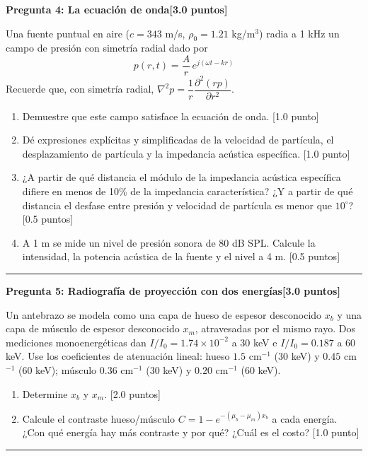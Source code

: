 \documentclass[11pt,a4paper]{article}
\newcommand{\sect}[1]{\vspace{10pt}{\large\bfseries #1}\par\vspace{-6pt}\rule{\linewidth}{0.4pt}\par}
\newcommand{\question}[2]{\vspace{6pt}\textbf{#1}\hfill\textbf{[#2]}\par}
\newcommand{\pts}[1]{\hfill[#1]}
\begin{document}
\question{Pregunta 4: La ecuación de onda}{3.0 puntos}
Una fuente puntual en aire ($c = 343$ m/s, $\rho_0 = 1.21$ kg/m$^3$) radia a 1 kHz un campo de presión con simetría radial dado por
\begin{equation}
p(r,t) = \frac{A}{r}\,e^{j(\omega t - kr)}
\end{equation}
Recuerde que, con simetría radial, $\nabla^2 p = \dfrac{1}{r}\dfrac{\partial^2 (r p)}{\partial r^2}$.
\begin{enumerate}
\item Demuestre que este campo satisface la ecuación de onda. \pts{1.0 punto}
\item Dé expresiones explícitas y simplificadas de la velocidad de partícula, el desplazamiento de partícula y la impedancia acústica específica. \pts{1.0 punto}
\item ¿A partir de qué distancia el módulo de la impedancia acústica específica difiere en menos de 10\% de la impedancia característica? ¿Y a partir de qué distancia el desfase entre presión y velocidad de partícula es menor que $10^\circ$? \pts{0.5 puntos}
\item A 1 m se mide un nivel de presión sonora de 80 dB SPL. Calcule la intensidad, la potencia acústica de la fuente y el nivel a 4 m. \pts{0.5 puntos}
\end{enumerate}

\sect{Rayos X}

\question{Pregunta 5: Radiografía de proyección con dos energías}{3.0 puntos}
Un antebrazo se modela como una capa de hueso de espesor desconocido $x_b$ y una capa de músculo de espesor desconocido $x_m$, atravesadas por el mismo rayo. Dos mediciones monoenergéticas dan $I/I_0 = 1.74\times10^{-2}$ a 30 keV e $I/I_0 = 0.187$ a 60 keV. Use los coeficientes de atenuación lineal: hueso $1.5$ cm$^{-1}$ (30 keV) y $0.45$ cm$^{-1}$ (60 keV); músculo $0.36$ cm$^{-1}$ (30 keV) y $0.20$ cm$^{-1}$ (60 keV).
\begin{enumerate}
\item Determine $x_b$ y $x_m$. \pts{2.0 puntos}
\item Calcule el contraste hueso/músculo $C = 1 - e^{-(\mu_b-\mu_m)x_b}$ a cada energía. ¿Con qué energía hay más contraste y por qué? ¿Cuál es el costo? \pts{1.0 punto}
\end{enumerate}

\sect{Tomografía computarizada}
\end{document}
